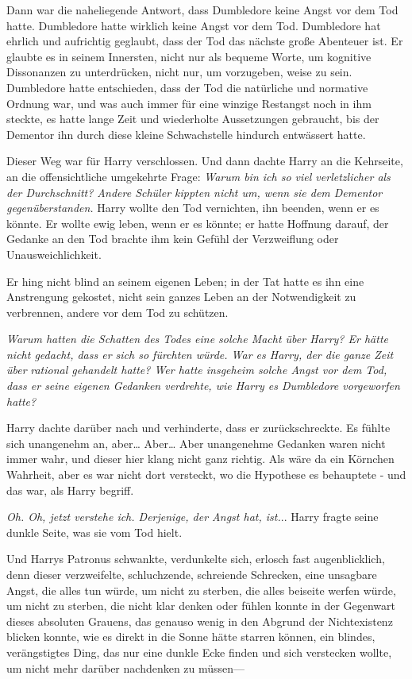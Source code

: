 {Dann war die naheliegende Antwort, dass Dumbledore keine Angst vor dem Tod hatte. Dumbledore hatte wirklich keine Angst vor dem Tod. Dumbledore hat ehrlich und aufrichtig geglaubt, dass der Tod das nächste große Abenteuer ist. Er glaubte es in seinem Innersten, nicht nur als bequeme Worte, um kognitive Dissonanzen zu unterdrücken, nicht nur, um vorzugeben, weise zu sein. Dumbledore hatte entschieden, dass der Tod die natürliche und normative Ordnung war, und was auch immer für eine winzige Restangst noch in ihm steckte, es hatte lange Zeit und wiederholte Aussetzungen gebraucht, bis der Dementor ihn durch diese kleine Schwachstelle hindurch entwässert hatte.

Dieser Weg war für Harry verschlossen. Und dann dachte Harry an die Kehrseite, an die offensichtliche umgekehrte Frage: \emph{Warum bin ich so viel verletzlicher als der Durchschnitt? Andere Schüler kippten nicht um, wenn sie dem Dementor gegenüberstanden.} Harry wollte den Tod vernichten, ihn beenden, wenn er es könnte. Er wollte ewig leben, wenn er es könnte; er hatte Hoffnung darauf, der Gedanke an den Tod brachte ihm kein Gefühl der Verzweiflung oder Unausweichlichkeit.

Er hing nicht blind an seinem eigenen Leben; in der Tat hatte es ihn eine Anstrengung gekostet, nicht sein ganzes Leben an der Notwendigkeit zu verbrennen, andere vor dem Tod zu schützen.

\emph{Warum hatten die Schatten des Todes eine solche Macht über Harry? Er hätte nicht gedacht, dass er sich so fürchten würde. War es Harry, der die ganze Zeit über} \emph{rational gehandelt hatte? Wer hatte insgeheim solche Angst vor dem Tod, dass er seine eigenen Gedanken verdrehte, wie Harry es Dumbledore vorgeworfen hatte?}

Harry dachte darüber nach und verhinderte, dass er zurückschreckte. Es fühlte sich unangenehm an, aber… Aber… Aber unangenehme Gedanken waren nicht immer wahr, und dieser hier klang nicht ganz richtig. Als wäre da ein Körnchen Wahrheit, aber es war nicht dort versteckt, wo die Hypothese es behauptete - und das war, als Harry begriff.

\emph{Oh. Oh, jetzt verstehe ich. Derjenige, der Angst hat, ist.}.. Harry fragte seine dunkle Seite, was sie vom Tod hielt.

Und Harrys Patronus schwankte, verdunkelte sich, erlosch fast augenblicklich, denn dieser verzweifelte, schluchzende, schreiende Schrecken, eine unsagbare Angst, die alles tun würde, um nicht zu sterben, die alles beiseite werfen würde, um nicht zu sterben, die nicht klar denken oder fühlen konnte in der Gegenwart dieses absoluten Grauens, das genauso wenig in den Abgrund der Nichtexistenz blicken konnte, wie es direkt in die Sonne hätte starren können, ein blindes, verängstigtes Ding, das nur eine dunkle Ecke finden und sich verstecken wollte, um nicht mehr darüber nachdenken zu müssen—

}
